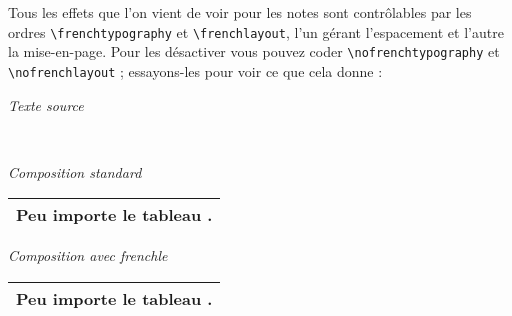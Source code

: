 \documentclass[a4paper,12pt,openright]{article}
\begin{document}
\frenchtypography\frenchlayout
Tous les effets que l’on vient de voir pour les notes sont contrôlables par
les ordres \texttt{{\backslash}french\-typography}
 et \verb|\frenchlayout|, l’un gérant l’espacement et
l’autre la mise-en-page. Pour les désactiver vous pouvez coder 
\texttt{{\backslash}nofrenchtypography}
et \texttt{{\backslash}nofrenchlayout} ; 
essayons-les pour voir ce que cela donne :
\begin{center} %
\textit{Texte source}\\
\\[.5em]
\setcounter{mpfootnote}{1} %
\renewcommand{\thempfootnote}{\arabic{mpfootnote}}
\parbox[t]{70mm}{
\begin{center}
\textit{Composition standard}
{\nofrenchtypography\nofrenchlayout
\begin{minipage}{65mm}
\begin{tabular}{|c|}
\hline
\rule{0pt}{1.6em}\Large Peu importe le tableau
\footnotemark[1].\\
\hline
\end{tabular}
\end{minipage}
}
\end{center}
}%
\parbox[t]{70mm}{
\begin{center}
\textit{Composition avec frenchle}

\begin{minipage}{65mm}
\begin{tabular}{|c|}
\hline
\rule{0pt}{1.6em}\Large Peu importe le tableau
\footnotemark[1].\\
\hline
\end{tabular}
\end{minipage}

\end{center}
}
%
\end{center}
\end{document}
